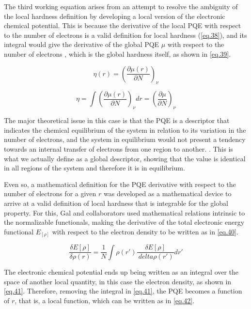 \documentclass[a4paper,11pt]{refart}
\begin{document}
	The third working equation arises from an attempt to resolve the ambiguity of the local hardness definition by developing a local version of the electronic chemical potential. This is because the derivative of the local PQE with respect to the number of electrons is a valid definition for local hardness (\autoref{eq.38}), and its integral would give the derivative of the global PQE $\mu$ with respect to the number of electrons , which is the global hardness itself, as shown in \autoref{eq.39}.

	\begin{equation}
	\eta(r) = \left( \frac{\partial \mu(r)}{\partial N } \right)_\nu
	\label{eq.38}
	\end{equation}

	\begin{equation}
	\eta = \int \left( \frac{\partial \mu(r)}{\partial N } \right)_\nu dr = \left( \frac{\partial \mu}{\partial N } \right )_\nu
	\label{eq.39}
	\end{equation}

	The major theoretical issue in this case is that the PQE is a descriptor that indicates the chemical equilibrium of the system in relation to its variation in the number of electrons, and the system in equilibrium would not present a tendency towards an internal transfer of electrons from one region to another. . This is what we actually define as a global descriptor, showing that the value is identical in all regions of the system and therefore it is in equilibrium.

	Even so, a mathematical definition for the PQE derivative with respect to the number of electrons for a given $r$ was developed as a mathematical device to arrive at a valid definition of local hardness that is integrable for the global property. For this, Gal and collaborators used mathematical relations intrinsic to the normalizable functionals\cite{gal2011new}, making the derivative of the total electronic energy functional $E_[\rho]$ with respect to the electron density to be written as in \autoref {eq.40}.


	\begin{equation}
	\frac{\delta E[\rho]}{\delta \rho(r)} = \frac{1}{N} \int \rho(r') \frac{\delta E[\rho]}{\ delta \rho(r')} dr'
	\label{eq.40}
	\end{equation}

	The electronic chemical potential ends up being written as an integral over the space of another local quantity, in this case the electron density, as shown in \autoref{eq.41}. Therefore, removing the integral in \autoref{eq.41}, the PQE becomes a function of $r$, that is, a local function, which can be written as in \autoref{eq.42}.
\end{document}
